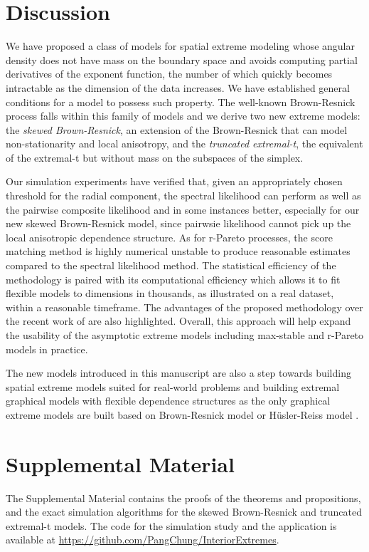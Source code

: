 \documentclass[12pt]{article}
\begin{document}
\section{Discussion}
We have proposed a class of models for spatial extreme modeling whose angular density does not have mass on the boundary space and avoids computing partial derivatives of the exponent function, the number of which quickly becomes intractable as the dimension of the data increases. 
We have established general conditions for a model to possess such property. The well-known Brown-Resnick process falls within this family of models and we derive two new extreme models: the \emph{skewed Brown-Resnick}, an extension of the Brown-Resnick that can model non-stationarity and local anisotropy, and the \emph{truncated extremal-t}, the equivalent of the extremal-t but without mass on the subspaces of the simplex.  

Our simulation experiments have verified that, given an appropriately chosen threshold for the radial component, the spectral likelihood can perform as well as the pairwise composite likelihood and in some instances better, especially for our new skewed Brown-Resnick model, since pairwsie likelihood cannot pick up the local anisotropic dependence structure. As for r-Pareto processes, the score matching method is highly numerical unstable to produce reasonable estimates compared to the spectral likelihood method. The statistical efficiency of the methodology is paired with its computational efficiency which allows it to fit flexible models to dimensions in thousands, as illustrated on a real dataset, within a reasonable timeframe. The advantages of the proposed methodology over the recent work of \citet{Huser.Zhong:2023} are also highlighted. Overall, this approach will help expand the usability of the asymptotic extreme models including max-stable and r-Pareto models in practice.  

The new models introduced in this manuscript are also a step towards building spatial extreme models suited for real-world problems and building extremal graphical models with flexible dependence structures as the only graphical extreme models are built based on Brown-Resnick model or H\"usler-Reiss model \citep{Engelke.Hitz:2020,Hentschel.Engelke.Segers:2024,Wan.Zhou:2023}. 

\section*{Supplemental Material}
The Supplemental Material contains the proofs of the theorems and propositions, and the exact simulation algorithms for the skewed Brown-Resnick and truncated extremal-t models. The code for the simulation study and the application is available at \url{https://github.com/PangChung/InteriorExtremes}. 
\end{document}
